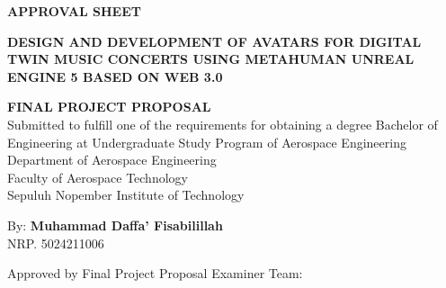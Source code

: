 \begin{center}
	\large
  \textbf{APPROVAL SHEET}
\end{center}

\thispagestyle{empty}

\begin{center}
  \textbf{DESIGN AND DEVELOPMENT OF AVATARS FOR DIGITAL TWIN MUSIC CONCERTS USING METAHUMAN UNREAL ENGINE 5 BASED ON WEB 3.0}
\end{center}

\begingroup
  \small

  \begin{center}
    \textbf{FINAL PROJECT PROPOSAL} \\
    Submitted to fulfill one of the requirements for obtaining a degree
    Bachelor of Engineering at 
    Undergraduate Study Program of Aerospace Engineering \\
    Department of Aerospace Engineering \\
    Faculty of Aerospace Technology \\
    Sepuluh Nopember Institute of Technology
  \end{center}

  \begin{center}
    By: \textbf{Muhammad Daffa' Fisabilillah} \\
    NRP. 5024211006
  \end{center}

  \begin{center}
    Approved by Final Project Proposal Examiner Team:
  \end{center}

  \begingroup
    \setlength{\tabcolsep}{0pt}

